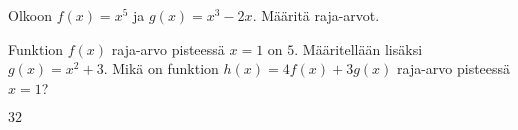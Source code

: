 \begin{tehtavasivu}


\begin{tehtava}
	Olkoon $f(x)=x^5$ ja $g(x)=x^3-2x$. Määritä raja-arvot.
	\begin{vastaus}
	\end{vastaus}
\end{tehtava}

\begin{tehtava}
	Funktion $f(x)$ raja-arvo pisteessä $x=1$ on $5$. Määritellään lisäksi $g(x) = x^2+3$. Mikä on funktion $h(x) = 4f(x) + 3g(x)$ raja-arvo pisteessä $x=1$?
	\begin{vastaus}
		$32$
	\end{vastaus}
\end{tehtava}

\end{tehtavasivu}
